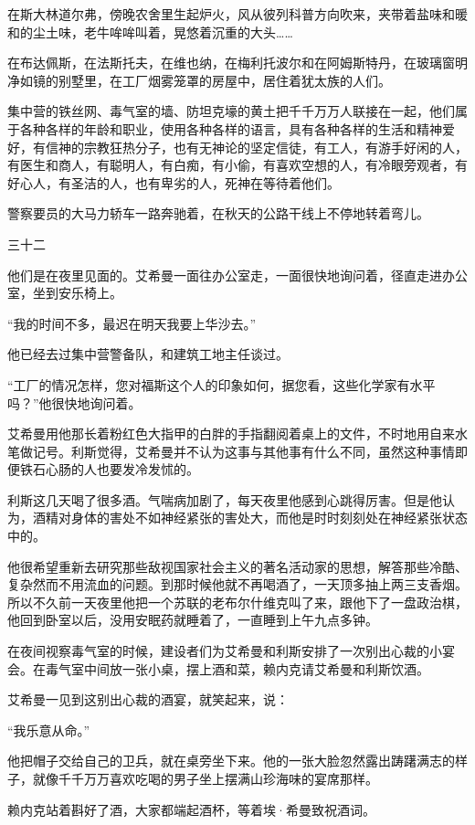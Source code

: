 在斯大林道尔弗，傍晚农舍里生起炉火，风从彼列科普方向吹来，夹带着盐味和暖和的尘土味，老牛哞哞叫着，晃悠着沉重的大头……

在布达佩斯，在法斯托夫，在维也纳，在梅利托波尔和在阿姆斯特丹，在玻璃窗明净如镜的别墅里，在工厂烟雾笼罩的房屋中，居住着犹太族的人们。

集中营的铁丝网、毒气室的墙、防坦克壕的黄土把千千万万人联接在一起，他们属于各种各样的年龄和职业，使用各种各样的语言，具有各种各样的生活和精神爱好，有信神的宗教狂热分子，也有无神论的坚定信徒，有工人，有游手好闲的人，有医生和商人，有聪明人，有白痴，有小偷，有喜欢空想的人，有冷眼旁观者，有好心人，有圣洁的人，也有卑劣的人，死神在等待着他们。

警察要员的大马力轿车一路奔驰着，在秋天的公路干线上不停地转着弯儿。

三十二

他们是在夜里见面的。艾希曼一面往办公室走，一面很快地询问着，径直走进办公室，坐到安乐椅上。

“我的时间不多，最迟在明天我要上华沙去。”

他已经去过集中营警备队，和建筑工地主任谈过。

“工厂的情况怎样，您对福斯这个人的印象如何，据您看，这些化学家有水平吗？”他很快地询问着。

艾希曼用他那长着粉红色大指甲的白胖的手指翻阅着桌上的文件，不时地用自来水笔做记号。利斯觉得，艾希曼并不认为这事与其他事有什么不同，虽然这种事情即便铁石心肠的人也要发冷发怵的。

利斯这几天喝了很多酒。气喘病加剧了，每天夜里他感到心跳得厉害。但是他认为，酒精对身体的害处不如神经紧张的害处大，而他是时时刻刻处在神经紧张状态中的。

他很希望重新去研究那些敌视国家社会主义的著名活动家的思想，解答那些冷酷、复杂然而不用流血的问题。到那时候他就不再喝酒了，一天顶多抽上两三支香烟。所以不久前一天夜里他把一个苏联的老布尔什维克叫了来，跟他下了一盘政治棋，他回到卧室以后，没用安眠药就睡着了，一直睡到上午九点多钟。

在夜间视察毒气室的时候，建设者们为艾希曼和利斯安排了一次别出心裁的小宴会。在毒气室中间放一张小桌，摆上酒和菜，赖内克请艾希曼和利斯饮酒。

艾希曼一见到这别出心裁的酒宴，就笑起来，说：

“我乐意从命。”

他把帽子交给自己的卫兵，就在桌旁坐下来。他的一张大脸忽然露出踌躇满志的样子，就像千千万万喜欢吃喝的男子坐上摆满山珍海味的宴席那样。

赖内克站着斟好了酒，大家都端起酒杯，等着埃·希曼致祝酒词。

